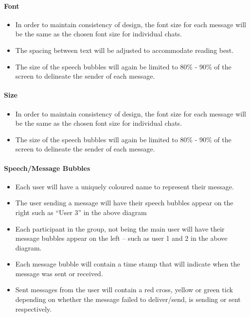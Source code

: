 \documentclass[11pt]{article}
\begin{document}
\paragraph{Font}
\begin{itemize}
\item	In order to maintain consistency of design, the font size for each message will be the same as the chosen font size for individual chats.
\item The spacing between text will be adjusted to accommodate reading best.
\item	The size of the speech bubbles will again be limited to 80\% - 90\% of the screen to delineate the sender of each message. \\
\end{itemize}

\paragraph{Size}
\begin{itemize}
\item	In order to maintain consistency of design, the font size for each message will be the same as the chosen font size for individual chats.
\item	The size of the speech bubbles will again be limited to 80\% - 90\% of the screen to delineate the sender of each message. \\
\end{itemize}

\paragraph{Speech/Message Bubbles}
\begin{itemize}
\item	Each user will have a uniquely coloured name to represent their message.
\item	The user sending a message will have their speech bubbles appear on the right such as “User 3” in the above diagram
\item	Each participant in the group, not being the main user will have their message bubbles appear on the left – such as user 1 and 2 in the above diagram.
\item Each message bubble will contain a time stamp that will indicate when the message was sent or received.
\item Sent messages from the user will contain a red cross, yellow or green tick depending on whether the message failed to deliver/send, is sending or sent respectively.\\
\end{itemize}
\end{document}

